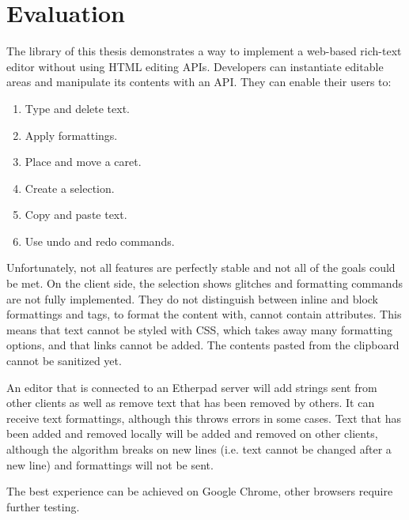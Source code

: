
\chapter{Evaluation}
\label{ch:evaluation}

The library of this thesis demonstrates a way to implement a web-based rich-text editor without using HTML editing APIs. Developers can instantiate editable areas and manipulate its contents with an API. They can enable their users to:

\begin{enumerate}
\item Type and delete text.
\item Apply formattings.
\item Place and move a caret.
\item Create a selection.
\item Copy and paste text.
\item Use undo and redo commands.
\end{enumerate}

Unfortunately, not all features are perfectly stable and not all of the goals could be met. On the client side, the selection shows glitches and formatting commands are not fully implemented. They do not distinguish between inline and block formattings and tags, to format the content with, cannot contain attributes. This means that text cannot be styled with CSS, which takes away many formatting options, and that links cannot be added. The contents pasted from the clipboard cannot be sanitized yet.

An editor that is connected to an Etherpad server will add strings sent from other clients as well as remove text that has been removed by others. It can receive text formattings, although this throws errors in some cases. Text that has been added and removed locally will be added and removed on other clients, although the algorithm breaks on new lines (i.e. text cannot be changed after a new line) and formattings will not be sent.

The best experience can be achieved on Google Chrome, other browsers require further testing.





